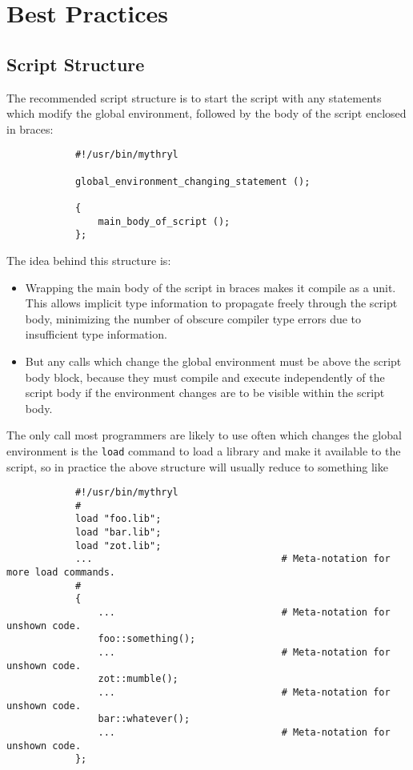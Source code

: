 \chapter{Best Practices}

%
%

\section{Script Structure}

The recommended script structure is to start the script 
with any statements which modify the global environment, 
followed by the body of the script enclosed in braces: 

\begin{verbatim}
            #!/usr/bin/mythryl 

            global_environment_changing_statement (); 

            { 
                main_body_of_script (); 
            }; 
\end{verbatim}

The idea behind this structure is: 

\begin{itemize}
\item Wrapping the main body of the script in braces makes it compile as a unit. 
      This allows implicit type information to propagate freely through the script 
      body, minimizing the number of obscure compiler type errors due to insufficient 
      type information. 
\item But any calls which change the global environment must be above the script 
      body block, because they must compile and execute independently of the script 
      body if the environment changes are to be visible within the script body. 
\end{itemize}

The only call most programmers are likely to use often 
which changes the global environment is the {\tt load} command 
to load a library and make it available to the script, so in 
practice the above structure will usually reduce to something like 

\begin{verbatim}
            #!/usr/bin/mythryl 
            #
            load "foo.lib";
            load "bar.lib";
            load "zot.lib";
            ...                                 # Meta-notation for more load commands.
            #
            { 
                ...                             # Meta-notation for unshown code.
                foo::something();
                ...                             # Meta-notation for unshown code.
                zot::mumble();
                ...                             # Meta-notation for unshown code.
                bar::whatever();
                ...                             # Meta-notation for unshown code.
            }; 
\end{verbatim}

